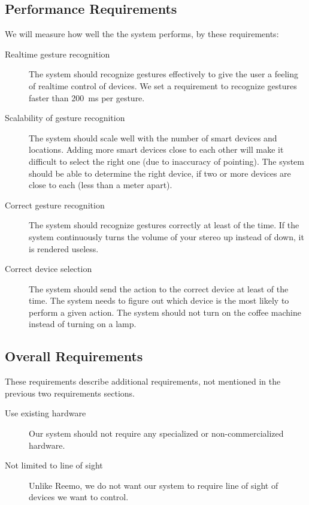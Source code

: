 \subsection{Performance Requirements}
We will measure how well the the system performs, by these requirements:
\begin{description}
    \item[Realtime gesture recognition] The system should recognize gestures effectively to give the user a feeling of realtime control of devices. We set a requirement to recognize gestures faster than \SI{200}{\milli\second} per gesture.
    \item[Scalability of gesture recognition] The system should scale well with the number of smart devices and locations. Adding more smart devices close to each other will make it difficult to select the right one (due to inaccuracy of pointing). The system should be able to determine the right device, if two or more devices are close to each (less than a meter apart).
    \item[Correct gesture recognition] The system should recognize gestures correctly at least  of the time. If the system continuously turns the volume of your stereo up instead of down, it is rendered useless.  
    \item[Correct device selection] The system should send the action to the correct device at least  of the time. The system needs to figure out which device is the most likely to perform a given action. The system should not turn on the coffee machine instead of turning on a lamp.
\end{description}
    
\subsection{Overall Requirements}
These requirements describe additional requirements, not mentioned in the previous two requirements sections.
\begin{description}
    \item[Use existing hardware] Our system should not require any specialized or non-commercialized hardware.  
    \item[Not limited to line of sight] Unlike Reemo, we do not want our system to require line of sight of devices we want to control. 
\end{description}

